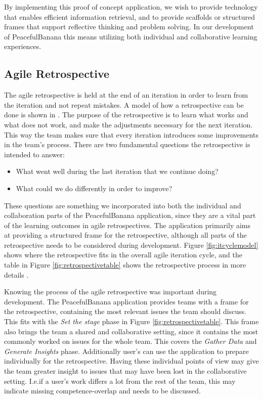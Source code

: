 By implementing this proof of concept application, we wish to provide technology that enables efficient information retrieval, and to provide scaffolds or structured frames that support reflective thinking and problem solving. In our development of PeacefulBanana this means utilizing both individual and collaborative learning experiences. 

\subsection{Agile Retrospective}
The agile retrospective is held at the end of an iteration in order to learn from the iteration and not repeat mistakes. A model of how a retrospective can be done is shown in \citep{Derby2006}. The purpose of the retrospective is to learn what works and what does not work, and make the adjustments necessary for the next iteration. This way the team makes sure that every iteration introduces some improvements in the team's process. There are two fundamental questions the retrospective is intended to answer:
\begin{itemize}
\item What went well during the last iteration that we continue doing?
\item What could we do differently in order to improve?
\end{itemize}
These questions are something we incorporated into both the individual and collaboration parts of the PeacefulBanana application, since they are a vital part of the learning outcomes in agile retrospectives. The application primarily aims at providing a structured frame for the retrospective, although all parts of the retrospective needs to be considered during development. 
Figure \ref{fig:itcyclemodel} shows where the retrospective fits in the overall agile iteration cycle, and the table in Figure \ref{fig:retrospectivetable} shows the retrospective process in more details \citep{Derby2006}.

Knowing the process of the agile retrospective was important during development. The PeacefulBanana application provides teams with a frame for the retrospective, containing the most relevant issues the team should discuss. This fits with the \emph{Set the stage} phase in Figure \ref{fig:retrospectivetable}. This frame also brings the team a shared and collaborative setting, since it contains the most commonly worked on issues for the whole team. This covers the \emph{Gather Data} and \emph{Generate Insights} phase. Additionally user's can use the application to prepare individually for the retrospective. Having these individual points of view may give the team greater insight to issues that may have been lost in the collaborative setting. I.e.if a user's work differs a lot from the rest of the team, this may indicate missing competence-overlap and needs to be discussed. 

